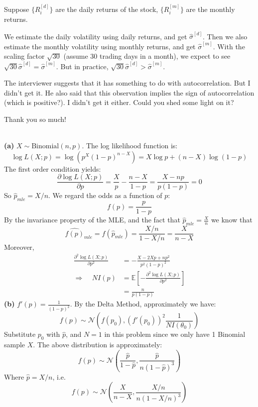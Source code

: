 \documentclass[a4paper, 10pt]{article}
\theoremstyle{definition}
\theoremstyle{hSol}
\begin{document}
Suppose $\{R_i^{[d]}\}$ are the daily returns of the stock, $\{R_{i}^{[m]}\}$ are the monthly returns. 

We estimate the daily volatility using daily returns, and get $\hat{\sigma}^{[d]}$. Then we also estimate the monthly volatility using monthly returns, and get $\hat{\sigma}^{[m]}$. With the scaling factor $\sqrt{30}$ (assume 30 trading days in a month), we expect to see $\sqrt{30}\hat{\sigma}^{[d]} = \hat{\sigma}^{[m]}$. But in practice, $\sqrt{30}\hat{\sigma}^{[d]} > \hat{\sigma}^{[m]}$.

The interviewer suggests that it has something to do with autocorrelation. But I didn't get it. He also said that this observation implies the sign of autocorrelation (which is positive?). I didn't get it either. Could you shed some light on it?

Thank you so much!


~\\
\textbf{(a)} $X\sim\text{Binomial}(n,p)$. The log likelihood function is:
\begin{equation}
  \log L(X; p) = \log \left(p^X(1-p)^{n-X}\right) = X\log p + (n-X)\log(1-p)
\end{equation}
The first order condition yields:
\begin{equation}
  \frac{\partial \log L(X;p)}{\partial p} = \frac{X}{p} - \frac{n-X}{1-p} = \frac{X-np}{p(1-p)} = 0
\end{equation}
So $\hat{p}_{mle} = X/n$. We regard the odds as a function of $p$: 
$$
f(p) = \frac{p}{1-p}
$$
By the invariance property of the MLE, and the fact that $\hat{p}_{mle} = \frac{X}{n}$ we know that
$$
\hat{f(p)}_{mle} = f(\hat{p}_{mle}) = \frac{X/n}{1-X/n} = \frac{X}{n-X}
$$
Moreover, 
\begin{equation}
  \begin{split}
    \frac{\partial^2 \log L(X;p)}{\partial p^2} &= -\frac{X-2Xp+np^2}{p^2(1-p)^2} \\
    \Rightarrow~~~~~NI(p) &= \mathbb{E}\left[-\frac{\partial^2 \log L(X;p)}{\partial p^2}\right]\\
    &= \frac{n}{p(1-p)}
  \end{split}
\end{equation}
\textbf{(b)} $f'(p) = \frac{1}{(1-p)^2}$. By the Delta Method, approximately we have:
\begin{equation}
  f(p)  \sim \mathcal{N}\left(f(p_0), (f'(p_0))^2 \frac{1}{NI(\theta_0)}\right)
\end{equation}
Substitute $p_0$ with $\hat{p}$, and $N=1$ in this problem since we only have 1 Binomial sample $X$. The above distribution is approximately:
$$
f(p)  \sim \mathcal{N}\left(\frac{\hat{p}}{1-\hat{p}}, \frac{\hat{p}}{n(1-\hat{p})^3}\right)
$$
Where $\hat{p}=X/n$, i.e.
\begin{equation}
  f(p)  \sim \mathcal{N}\left(\frac{X}{n-X}, \frac{X/n}{n(1-X/n)^3}\right)
\end{equation}
\end{document}
